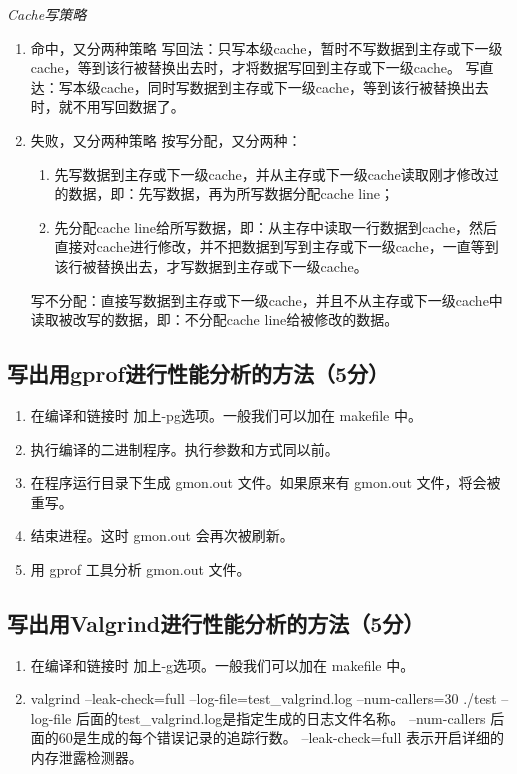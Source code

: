 \emph{Cache写策略}

\begin{enumerate}
    \item 命中，又分两种策略
    \subitem 写回法：只写本级cache，暂时不写数据到主存或下一级cache，等到该行被替换出去时，才将数据写回到主存或下一级cache。
    \subitem 写直达：写本级cache，同时写数据到主存或下一级cache，等到该行被替换出去时，就不用写回数据了。
    \item 失败，又分两种策略
    \subitem 按写分配，又分两种：
    \begin{enumerate}
        \item 先写数据到主存或下一级cache，并从主存或下一级cache读取刚才修改过的数据，即：先写数据，再为所写数据分配cache line；
        \item 先分配cache line给所写数据，即：从主存中读取一行数据到cache，然后直接对cache进行修改，并不把数据到写到主存或下一级cache，一直等到该行被替换出去，才写数据到主存或下一级cache。
    \end{enumerate}
    \subitem 写不分配：直接写数据到主存或下一级cache，并且不从主存或下一级cache中读取被改写的数据，即：不分配cache line给被修改的数据。
\end{enumerate}


\subsection{写出用gprof进行性能分析的方法（5分）}

\begin{enumerate}
    \item 在编译和链接时 加上-pg选项。一般我们可以加在 makefile 中。
    \item 执行编译的二进制程序。执行参数和方式同以前。
    \item 在程序运行目录下生成 gmon.out 文件。如果原来有 gmon.out 文件，将会被重写。
    \item 结束进程。这时 gmon.out 会再次被刷新。
    \item 用 gprof 工具分析 gmon.out 文件。
\end{enumerate}

\subsection{写出用Valgrind进行性能分析的方法（5分）}

\begin{enumerate}
    \item 在编译和链接时 加上-g选项。一般我们可以加在 makefile 中。
    \item valgrind --leak-check=full --log-file=test\_valgrind.log --num-callers=30 ./test
    \subitem --log-file 后面的test\_valgrind.log是指定生成的日志文件名称。
    \subitem --num-callers 后面的60是生成的每个错误记录的追踪行数。
    \subitem --leak-check=full 表示开启详细的内存泄露检测器。
\end{enumerate}
